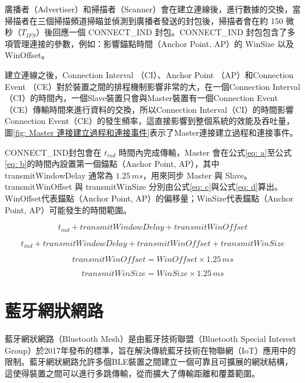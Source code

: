 \begin{ZhChapter}
廣播者（Advertiser）和掃描者（Scanner）會在建立連線後，進行數據的交換，當掃描者在三個掃描頻道掃瞄並偵測到廣播者發送的封包後，掃描者會在約 150 微秒（$T_{IFS}$）後回應一個 CONNECT\_IND 封包。CONNECT\_IND 封包包含了多項管理連接的參數，例如：影響錨點時間（Anchor Point, AP）的 WinSize 以及 WinOffset。

建立連線之後，Connection Interval （CI）、Anchor Point （AP）和Connection Event （CE）對於裝置之間的排程機制影響非常的大，在一個Connection Interval（CI）的時間內，一個Slave裝置只會與Master裝置有一個Connection Event（CE）傳輸時間來進行資料的交換，所以Connection Interval（CI）的時間影響Connection Event（CE）的發生頻率，這直接影響到整個系統的效能及吞吐量，圖\ref{fig: Master 連接建立過程和連接事件}表示了Master連接建立過程和連接事件。                                            

CONNECT\_IND封包會在 $t_{ind}$ 時間內完成傳輸，Master 會在公式\ref{eq: a}至公式\ref{eq: b}的時間內設置第一個錨點（Anchor Point, AP），其中 transmitWindowDelay 通常為 $1.25\,{ms}$，用來同步 Master 與 Slave。transmitWinOffset 與 transmitWinSize 分別由公式\ref{eq: c}與公式\ref{eq: d}算出。WinOffset代表錨點（Anchor Point, AP）的偏移量；WinSize代表錨點（Anchor Point, AP）可能發生的時間範圍\cite{10.1145/3412382.3458271}。

\begin{equation}
t_{ind} + transmitWindowDelay + transmitWinOffset
\label{eq: a}
\end{equation}

\begin{equation}
t_{ind} + transmitWindowDelay + transmitWinOffset + transmitWinSize
\label{eq: b}
\end{equation}

\begin{equation}
transmitWinOffset = WinOffset \times 1.25\, ms
\label{eq: c}
\end{equation}

\begin{equation}
transmitWinSize = WinSize \times 1.25\, ms 
\label{eq: d}
\end{equation}

\section{藍牙網狀網路}

藍牙網狀網路（Bluetooth Mesh）是由藍牙技術聯盟（Bluetooth Special Interest Group）於2017年發布的標準，旨在解決傳統藍牙技術在物聯網（IoT）應用中的限制。藍牙網狀網路允許多個BLE裝置之間建立一個可靠且可擴展的網狀結構，這使得裝置之間可以進行多跳傳輸，從而擴大了傳輸距離和覆蓋範圍。


\end{ZhChapter}
